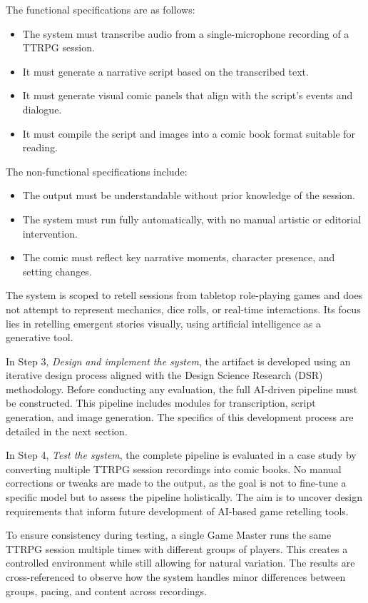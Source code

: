 The functional specifications are as follows:
\begin{itemize}
\item The system must transcribe audio from a single-microphone recording of a TTRPG session.
\item It must generate a narrative script based on the transcribed text.
\item It must generate visual comic panels that align with the script's events and dialogue.
\item It must compile the script and images into a comic book format suitable for reading.
\end{itemize}

The non-functional specifications include:
\begin{itemize}
\item The output must be understandable without prior knowledge of the session.
\item The system must run fully automatically, with no manual artistic or editorial intervention.
\item The comic must reflect key narrative moments, character presence, and setting changes.
\end{itemize}

The system is scoped to retell sessions from tabletop role-playing games and does not attempt to represent mechanics, dice rolls, or real-time interactions. Its focus lies in retelling emergent stories visually, using artificial intelligence as a generative tool.

In Step 3, \textit{Design and implement the system}, the artifact is developed using an iterative design process aligned with the Design Science Research (DSR) methodology. Before conducting any evaluation, the full AI-driven pipeline must be constructed. This pipeline includes modules for transcription, script generation, and image generation. The specifics of this development process are detailed in the next section.

In Step 4, \textit{Test the system}, the complete pipeline is evaluated in a case study by converting multiple TTRPG session recordings into comic books. No manual corrections or tweaks are made to the output, as the goal is not to fine-tune a specific model but to assess the pipeline holistically. The aim is to uncover design requirements that inform future development of AI-based game retelling tools.

To ensure consistency during testing, a single Game Master runs the same TTRPG session multiple times with different groups of players. This creates a controlled environment while still allowing for natural variation. The results are cross-referenced to observe how the system handles minor differences between groups, pacing, and content across recordings.

